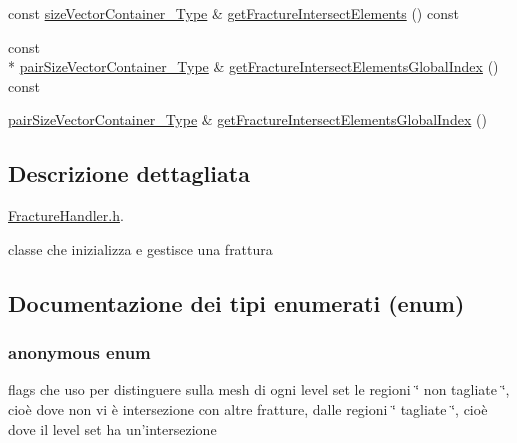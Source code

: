 \begin{DoxyCompactItemize}
const \hyperlink{Core_8h_a80e8381d86ecb0a7f4f87ff84d1a0be5}{size\-Vector\-Container\-\_\-\-Type} \& \hyperlink{classFractureHandler_ab722c7fb4c48e062a8060251c4cb80c3}{get\-Fracture\-Intersect\-Elements} () const 
\item 
const \\*
\hyperlink{Core_8h_a9bc476e433f99b82a9c2b8560735c7b5}{pair\-Size\-Vector\-Container\-\_\-\-Type} \& \hyperlink{classFractureHandler_a7f439a7c14b6064d52984130f8bcb7c1}{get\-Fracture\-Intersect\-Elements\-Global\-Index} () const 
\item 
\hyperlink{Core_8h_a9bc476e433f99b82a9c2b8560735c7b5}{pair\-Size\-Vector\-Container\-\_\-\-Type} \& \hyperlink{classFractureHandler_ac4156ff43fcdc7a4641aef8cdabf2357}{get\-Fracture\-Intersect\-Elements\-Global\-Index} ()
\end{DoxyCompactItemize}


\subsection{Descrizione dettagliata}
\hyperlink{FractureHandler_8h}{Fracture\-Handler.\-h}. 

classe che inizializza e gestisce una frattura 

\subsection{Documentazione dei tipi enumerati (enum)}
\hypertarget{classFractureHandler_a495ad4fc72d0c47c8f0424842f1153aa}{\subsubsection[{anonymous enum}]{\setlength{\rightskip}{0pt plus 5cm}anonymous enum}}\label{classFractureHandler_a495ad4fc72d0c47c8f0424842f1153aa}


flags che uso per distinguere sulla mesh di ogni level set le regioni \char`\"{} non tagliate \char`\"{}, cioè dove non vi è intersezione con altre fratture, dalle regioni \char`\"{} tagliate \char`\"{}, cioè dove il level set ha un'intersezione 

